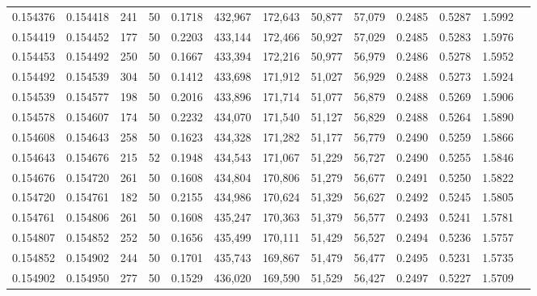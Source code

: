 \begin{tabular}{rrrrrrrrrrrrr}
0.154376 & 0.154418 &   241 &  50 &                                     0.1718 & 432,967 & 172,643 &  50,877 &  57,079 & 0.2485 & 0.5287 & 1.5992 \\
0.154419 & 0.154452 &   177 &  50 &                                     0.2203 & 433,144 & 172,466 &  50,927 &  57,029 & 0.2485 & 0.5283 & 1.5976 \\
0.154453 & 0.154492 &   250 &  50 &                                     0.1667 & 433,394 & 172,216 &  50,977 &  56,979 & 0.2486 & 0.5278 & 1.5952 \\
0.154492 & 0.154539 &   304 &  50 &                                     0.1412 & 433,698 & 171,912 &  51,027 &  56,929 & 0.2488 & 0.5273 & 1.5924 \\
0.154539 & 0.154577 &   198 &  50 &                                     0.2016 & 433,896 & 171,714 &  51,077 &  56,879 & 0.2488 & 0.5269 & 1.5906 \\
0.154578 & 0.154607 &   174 &  50 &                                     0.2232 & 434,070 & 171,540 &  51,127 &  56,829 & 0.2488 & 0.5264 & 1.5890 \\
0.154608 & 0.154643 &   258 &  50 &                                     0.1623 & 434,328 & 171,282 &  51,177 &  56,779 & 0.2490 & 0.5259 & 1.5866 \\
0.154643 & 0.154676 &   215 &  52 &                                     0.1948 & 434,543 & 171,067 &  51,229 &  56,727 & 0.2490 & 0.5255 & 1.5846 \\
0.154676 & 0.154720 &   261 &  50 &                                     0.1608 & 434,804 & 170,806 &  51,279 &  56,677 & 0.2491 & 0.5250 & 1.5822 \\
0.154720 & 0.154761 &   182 &  50 &                                     0.2155 & 434,986 & 170,624 &  51,329 &  56,627 & 0.2492 & 0.5245 & 1.5805 \\
0.154761 & 0.154806 &   261 &  50 &                                     0.1608 & 435,247 & 170,363 &  51,379 &  56,577 & 0.2493 & 0.5241 & 1.5781 \\
0.154807 & 0.154852 &   252 &  50 &                                     0.1656 & 435,499 & 170,111 &  51,429 &  56,527 & 0.2494 & 0.5236 & 1.5757 \\
0.154852 & 0.154902 &   244 &  50 &                                     0.1701 & 435,743 & 169,867 &  51,479 &  56,477 & 0.2495 & 0.5231 & 1.5735 \\
0.154902 & 0.154950 &   277 &  50 &                                     0.1529 & 436,020 & 169,590 &  51,529 &  56,427 & 0.2497 & 0.5227 & 1.5709 \\

\end{tabular}
